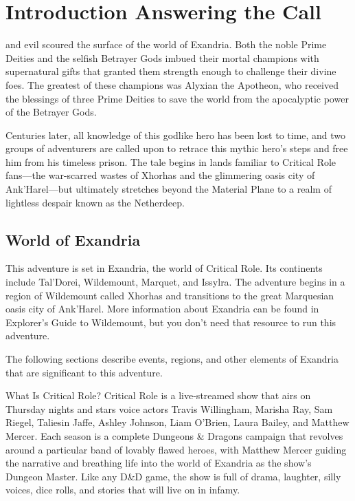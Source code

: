 \documentclass[10pt,a4paper,twoside,bg=print,twocolumn,openany,nodeprecatedcode]{dndbook}
\begin{document}
\tableofcontents
\newpage

\chapter*{Introduction \textendash{} Answering the Call}


 and evil scoured the surface of the world of Exandria. Both the noble Prime Deities and the selfish Betrayer Gods imbued their mortal champions with supernatural gifts that granted them strength enough to challenge their divine foes. The greatest of these champions was Alyxian the Apotheon, who received the blessings of three Prime Deities to save the world from the apocalyptic power of the Betrayer Gods.

Centuries later, all knowledge of this godlike hero has been lost to time, and two groups of adventurers are called upon to retrace this mythic hero's steps and free him from his timeless prison. The tale begins in lands familiar to Critical Role fans—the war-scarred wastes of Xhorhas and the glimmering oasis city of Ank'Harel—but ultimately stretches beyond the Material Plane to a realm of lightless despair known as the Netherdeep.

\section{World of Exandria}
This adventure is set in Exandria, the world of Critical Role. Its continents include Tal'Dorei, Wildemount, Marquet, and Issylra. The adventure begins in a region of Wildemount called Xhorhas and transitions to the great Marquesian oasis city of Ank'Harel. More information about Exandria can be found in Explorer's Guide to Wildemount, but you don't need that resource to run this adventure.

The following sections describe events, regions, and other elements of Exandria that are significant to this adventure.

\begin{DndSidebar}[float=!b]{What Is Critical Role?}
Critical Role is a live-streamed show that airs on Thursday nights and stars voice actors Travis Willingham, Marisha Ray, Sam Riegel, Taliesin Jaffe, Ashley Johnson, Liam O'Brien, Laura Bailey, and Matthew Mercer. Each season is a complete Dungeons \& Dragons campaign that revolves around a particular band of lovably flawed heroes, with Matthew Mercer guiding the narrative and breathing life into the world of Exandria as the show's Dungeon Master. Like any D\&D game, the show is full of drama, laughter, silly voices, dice rolls, and stories that will live on in infamy.
\end{DndSidebar}
\end{document}
